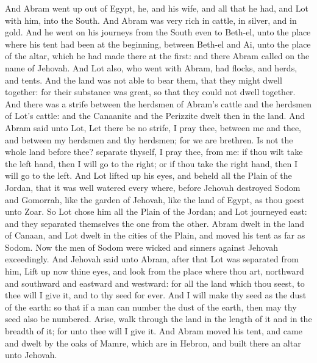 And Abram went up out of Egypt, he, and his wife, and all that he had, and Lot with him, into the South. And Abram was very rich in cattle, in silver, and in gold. And he went on his journeys from the South even to Beth-el, unto the place where his tent had been at the beginning, between Beth-el and Ai, unto the place of the altar, which he had made there at the first: and there Abram called on the name of Jehovah. And Lot also, who went with Abram, had flocks, and herds, and tents. And the land was not able to bear them, that they might dwell together: for their substance was great, so that they could not dwell together. And there was a strife between the herdsmen of Abram’s cattle and the herdsmen of Lot’s cattle: and the Canaanite and the Perizzite dwelt then in the land. And Abram said unto Lot, Let there be no strife, I pray thee, between me and thee, and between my herdsmen and thy herdsmen; for we are brethren. Is not the whole land before thee? separate thyself, I pray thee, from me: if thou wilt take the left hand, then I will go to the right; or if thou take the right hand, then I will go to the left. And Lot lifted up his eyes, and beheld all the Plain of the Jordan, that it was well watered every where, before Jehovah destroyed Sodom and Gomorrah, like the garden of Jehovah, like the land of Egypt, as thou goest unto Zoar. So Lot chose him all the Plain of the Jordan; and Lot journeyed east: and they separated themselves the one from the other. Abram dwelt in the land of Canaan, and Lot dwelt in the cities of the Plain, and moved his tent as far as Sodom. Now the men of Sodom were wicked and sinners against Jehovah exceedingly.  And Jehovah said unto Abram, after that Lot was separated from him, Lift up now thine eyes, and look from the place where thou art, northward and southward and eastward and westward: for all the land which thou seest, to thee will I give it, and to thy seed for ever. And I will make thy seed as the dust of the earth: so that if a man can number the dust of the earth, then may thy seed also be numbered. Arise, walk through the land in the length of it and in the breadth of it; for unto thee will I give it. And Abram moved his tent, and came and dwelt by the oaks of Mamre, which are in Hebron, and built there an altar unto Jehovah. 

